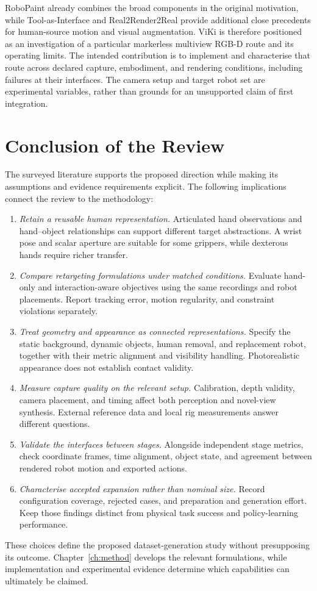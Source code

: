 RoboPaint already combines the broad components in the original motivation,
while Tool-as-Interface and Real2Render2Real provide additional close precedents
for human-source motion and visual augmentation. ViKi is therefore positioned
as an investigation of a particular markerless multiview RGB-D route and its
operating limits. The intended contribution is to implement and characterise
that route across declared capture, embodiment, and rendering conditions,
including failures at their interfaces. The camera setup and target robot set
are experimental variables, rather than grounds for an unsupported claim of
first integration.

\section{Conclusion of the Review}
\label{sec:lit-conclusion}

The surveyed literature supports the proposed direction while making its
assumptions and evidence requirements explicit. The following implications
connect the review to the methodology:

\begin{enumerate}[leftmargin=2em]
  \item \emph{Retain a reusable human representation.} Articulated hand
        observations and hand--object relationships can support different
        target abstractions. A wrist pose and scalar aperture are suitable
        for some grippers, while dexterous hands require richer transfer.
  \item \emph{Compare retargeting formulations under matched conditions.}
        Evaluate hand-only and interaction-aware objectives using the same
        recordings and robot placements. Report tracking error, motion
        regularity, and constraint violations separately.
  \item \emph{Treat geometry and appearance as connected representations.}
        Specify the static background, dynamic objects, human removal, and
        replacement robot, together with their metric alignment and visibility
        handling. Photorealistic appearance does not establish contact validity.
  \item \emph{Measure capture quality on the relevant setup.} Calibration,
        depth validity, camera placement, and timing affect both perception
        and novel-view synthesis. External reference data and local rig
        measurements answer different questions.
  \item \emph{Validate the interfaces between stages.} Alongside independent
        stage metrics, check coordinate frames, time alignment, object state,
        and agreement between rendered robot motion and exported actions.
  \item \emph{Characterise accepted expansion rather than nominal size.}
        Record configuration coverage, rejected cases, and preparation and
        generation effort. Keep those findings distinct from physical task
        success and policy-learning performance.
\end{enumerate}

These choices define the proposed dataset-generation study without presupposing
its outcome. Chapter~\ref{ch:method} develops the relevant formulations, while
implementation and experimental evidence determine which capabilities can
ultimately be claimed.
